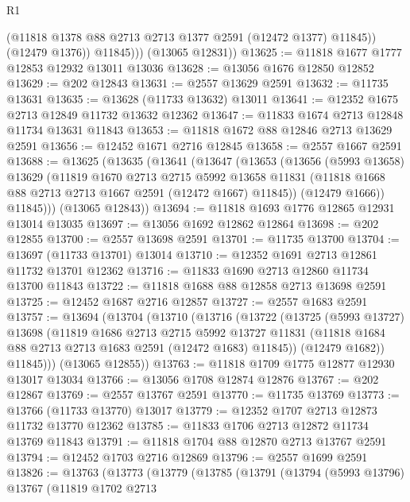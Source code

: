 \begin{lexlean}{R1}
\begin{coremodule}
                (@11818 @1378 @88 @2713 @2713 @1377 @2591 (@12472 @1377) @11845))
              (@12479 @1376))
            @11845)))
      (@13065 @12831))
@13625 := @11818 @1677 @1777 @12853 @12932 @13011 @13036
@13628 := @13056 @1676 @12850 @12852
@13629 := @202 @12843
@13631 := @2557 @13629 @2591
@13632 := @11735 @13631
@13635 := @13628 (@11733 @13632) @13011
@13641 := @12352 @1675 @2713 @12849 @11732 @13632 @12362
@13647 := @11833 @1674 @2713 @12848 @11734 @13631 @11843
@13653 := @11818 @1672 @88 @12846 @2713 @13629 @2591
@13656 := @12452 @1671 @2716 @12845
@13658 := @2557 @1667 @2591
@13688 := @13625
    (@13635
      (@13641
        (@13647
          (@13653
            (@13656
              (@5993 @13658)
              @13629
              (@11819
                @1670
                @2713
                @2715
                @5992
                @13658
                @11831
                (@11818 @1668 @88 @2713 @2713 @1667 @2591 (@12472 @1667) @11845))
              (@12479 @1666))
            @11845)))
      (@13065 @12843))
@13694 := @11818 @1693 @1776 @12865 @12931 @13014 @13035
@13697 := @13056 @1692 @12862 @12864
@13698 := @202 @12855
@13700 := @2557 @13698 @2591
@13701 := @11735 @13700
@13704 := @13697 (@11733 @13701) @13014
@13710 := @12352 @1691 @2713 @12861 @11732 @13701 @12362
@13716 := @11833 @1690 @2713 @12860 @11734 @13700 @11843
@13722 := @11818 @1688 @88 @12858 @2713 @13698 @2591
@13725 := @12452 @1687 @2716 @12857
@13727 := @2557 @1683 @2591
@13757 := @13694
    (@13704
      (@13710
        (@13716
          (@13722
            (@13725
              (@5993 @13727)
              @13698
              (@11819
                @1686
                @2713
                @2715
                @5992
                @13727
                @11831
                (@11818 @1684 @88 @2713 @2713 @1683 @2591 (@12472 @1683) @11845))
              (@12479 @1682))
            @11845)))
      (@13065 @12855))
@13763 := @11818 @1709 @1775 @12877 @12930 @13017 @13034
@13766 := @13056 @1708 @12874 @12876
@13767 := @202 @12867
@13769 := @2557 @13767 @2591
@13770 := @11735 @13769
@13773 := @13766 (@11733 @13770) @13017
@13779 := @12352 @1707 @2713 @12873 @11732 @13770 @12362
@13785 := @11833 @1706 @2713 @12872 @11734 @13769 @11843
@13791 := @11818 @1704 @88 @12870 @2713 @13767 @2591
@13794 := @12452 @1703 @2716 @12869
@13796 := @2557 @1699 @2591
@13826 := @13763
    (@13773
      (@13779
        (@13785
          (@13791
            (@13794
              (@5993 @13796)
              @13767
              (@11819
                @1702
                @2713

\end{coremodule}
\end{lexlean}
